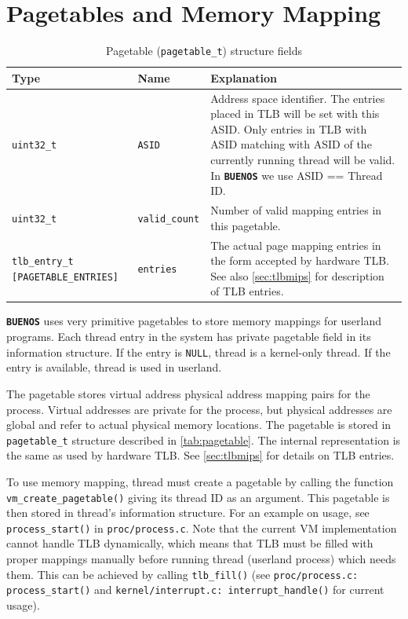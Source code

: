 \documentclass[twoside,a4paper]{report}
\newcommand{\PBS}[1]{\let\temp=\\#1\let\\=\temp}
\newlength{\tablewidth}
\newenvironment{structdescription}{%
\begin{center}%
\begin{tabular}{p{3.5cm}|p{2.5cm}|>{\PBS\raggedright}p{\tablewidth-6\tabcolsep-6cm}}%
\textbf{Type} & \textbf{Name} & \textbf{Explanation} \\ %
}{%
\end{tabular}%
\end{center}%
}
\newcommand{\structfield}[3]{%
\hline%
\texttt{#1} & \texttt{#2} & #3 \\%
}
\newcommand{\buenos}{\texttt{\textbf{BUENOS}}}
\begin{document}
\section{Pagetables and Memory Mapping}


\begin{table}
\begin{structdescription}

\structfield{uint32\_t}{ASID}{Address space identifier. The entries
placed in TLB will be set with this ASID. Only entries in TLB with
ASID matching with ASID of the currently running thread will be
valid. In \buenos{} we use ASID == Thread ID.}

\structfield{uint32\_t}{valid\_count}{Number of valid mapping entries
in this pagetable.}

\structfield{tlb\_entry\_t [PAGETABLE\_ENTRIES]}{entries}{The actual
page mapping entries in the form accepted by hardware TLB. See also
\autoref{sec:tlbmips} for description of TLB entries.}

\end{structdescription}

\caption{Pagetable (\texttt{pagetable\_t}) structure fields}
\label{tab:pagetable}
\end{table}

\buenos{} uses very primitive pagetables to store memory mappings for
userland programs. Each thread entry in the system has private
pagetable field in its information structure. If the entry is
\texttt{NULL}, thread is a kernel-only thread. If the entry is available,
thread is used in userland. 

The pagetable stores virtual address physical address mapping pairs
for the process. Virtual addresses are private for the process, but
physical addresses are global and refer to actual physical memory
locations. The pagetable is stored in \texttt{pagetable\_t}
 structure described in
\autoref{tab:pagetable}. The internal representation is the same as
used by hardware TLB. See \autoref{sec:tlbmips} for details on TLB
entries.

To use memory mapping, thread must create a pagetable by calling the
function \texttt{vm\_create\_pagetable()} giving its thread ID as an
argument. This pagetable is then stored in thread's information
structure. For an example on usage, see \texttt{process\_start()} in
\texttt{proc/process.c}. Note that the current VM implementation
cannot handle TLB dynamically, which means that TLB must be filled
with proper mappings manually before running thread (userland process)
which needs them. This can be achieved by calling \texttt{tlb\_fill()}
 (see \texttt{proc/process.c:
process\_start()} and \texttt{kernel/interrupt.c: interrupt\_handle()}
for current usage).
\end{document}
